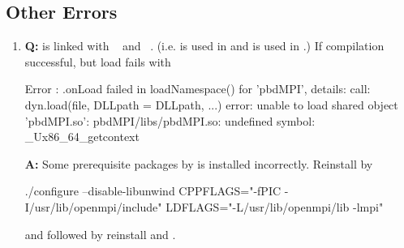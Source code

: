 \subsection[Other Errors]{Other Errors}
\label{sec:other_errors}


\begin{enumerate}
\item {\bf\color{blue} Q:} 
       is linked with ~\citep{Chen2013pbdPROFpackage}
      and ~\citep{mpiP}.
      (i.e. \code{-} is used in  and
            \code{-} is used in .)
      If  compilation successful, but load fails with 
\begin{Error}
Error : .onLoad failed in loadNamespace() for 'pbdMPI', details:
  call: dyn.load(file, DLLpath = DLLpath, ...)
  error: unable to load shared object 'pbdMPI.so':
  pbdMPI/libs/pbdMPI.so: undefined symbol: _Ux86_64_getcontext
\end{Error}
      {\bf\color{blue} A:}
      Some prerequisite packages by  is installed incorrectly.
      Reinstall  by
\begin{Code}
./configure --disable-libunwind CPPFLAGS="-fPIC -I/usr/lib/openmpi/include" LDFLAGS="-L/usr/lib/openmpi/lib -lmpi"
\end{Code}
      and followed by reinstall  and .

\end{enumerate}
